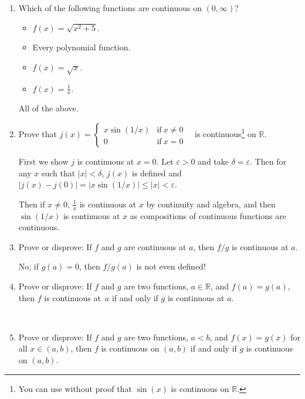 \documentclass[12pt]{amsart}
\def\de{\delta}
\def\ds{\displaystyle}
\def\e{\varepsilon}
\newcommand{\R}{{\mathbb{R}}}
\numberwithin{equation}{section}
\theoremstyle{plain} %
\theoremstyle{definition}
\theoremstyle{remark}
\begin{document}
\begin{enumerate}
 

 
 \item Which of the following functions are continuous on $(0,\infty)$?
 \begin{multicols}{2} 
 \begin{itemize}
 \item $f(x)=\sqrt{ x^2 +5}$.
 \item Every polynomial function.
  \item $f(x) = \sqrt{x}$.
  \item $f(x)=\ds\frac{1}{x}$.
 \end{itemize}
 \end{multicols}
  \begin{framed}
All of the above.
\end{framed}
 
 
 
 \item Prove that $j(x) =\begin{cases} x \sin(1/x) & \text{if} \ x\neq 0 \\ 0 & \text{if} \ x= 0\end{cases}$\ \ is continuous\footnote{You can use without proof that $\sin(x)$ is continuous on $\R$.} on $\R$.
  \begin{framed}
First we show $j$ is continuous at $x=0$. Let $\e>0$ and take $\de=\e$. Then for any $x$ such that $|x|<\de$, $j(x)$ is defined and $|j(x) - j(0)| = |x \sin(1/x)| \leq |x|<\e$.

Then if $x\neq 0$, $\frac{1}{x}$ is continuous at $x$ by continuity and algebra, and then $\sin(1/x)$ is continuous at $x$ as compositions of continuous functions are continuous.
\end{framed}
 
 \item Prove or disprove: If $f$ and $g$ are continuous at $a$, then $f/g$ is continuous at $a$.
 
  \begin{framed}
No, if $g(a)=0$, then $f/g(a)$ is not even defined!
\end{framed}
 
 \item Prove or disprove: If $f$ and $g$ are two functions, $a\in \R$, and  $f(a)=g(a)$, then $f$ is continuous at~$a$ if and only if $g$ is continuous at $a$.
 
 \

 
 \item Prove or disprove: If $f$ and $g$ are two functions, $a<b$, and  $f(x)=g(x)$ for all $x\in (a,b)$, then $f$ is continuous on $(a,b)$ if and only if $g$ is continuous on $(a,b)$.
   \end{enumerate}
   
\end{document}
